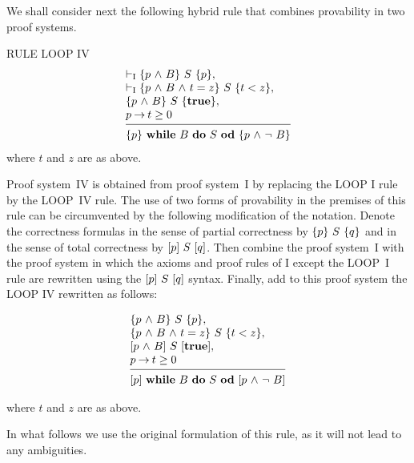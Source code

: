 \documentclass[manuscript, screen, review]{acmart}
\begin{document}
We shall consider next the following hybrid rule that combines provability in two
proof systems.
\III

\NI
RULE LOOP IV
\[
 \begin{array}{l}
  \vdash_{\rm{I}}  \HT{p \A B}{S}{p},             \\
  \vdash_{\rm{I}}   \HT{p \A B \A t=z}{S}{t<z},   \\
  \HT{p \A B}{S}{\mathbf{true}},                  \\
  p \ra t \geq 0                                 \\
  [-\medskipamount]
  \hrulefill                                      \\
  \HT{p}{\WDD{B}{S}}{p \A \neg\ B}
 \end{array}
\]
%
\NI
where $t$ and $z$ are as above.
\III

Proof system~IV is obtained from proof system~I by replacing the LOOP
I rule by the LOOP~IV rule. The use of two forms of provability in the
premises of this rule can be circumvented by the following
modification of the notation.  Denote the correctness
formulas in the sense of partial correctness by $\mbox{$\{{p}\}\ {S}\ \{{q}\}$}$ and in
the sense of total correctness by $[{p}]\ {S}\ [{q}]$. Then combine the
proof system~I with the proof system in which the axioms and proof
rules of I except the LOOP~I rule are rewritten using the
$[{p}]\ {S}\ [{q}]$ syntax. Finally, add to this proof system the LOOP IV
rewritten as follows:
\III

\[
 \begin{array}{l}
  \HT{p \A B}{S}{p},                      \\
  \HT{p \A B \A t=z}{S}{t<z},             \\
  \HTT{p \A B}{S}{\mathbf{true}},         \\
  p \ra t \geq 0                         \\
  [-\medskipamount]
  \hrulefill                              \\
  \HTT{p}{\WDD{B}{S}}{p \A \neg\ B}
 \end{array}
\]

\NI
where $t$ and $z$ are as above.
\III

In what follows we use the original formulation of this rule, 
as it will not lead to any ambiguities.


\end{document}
